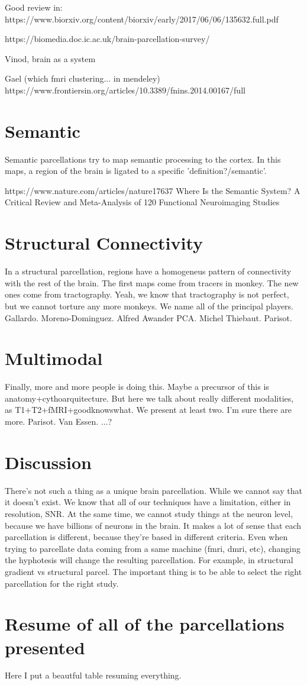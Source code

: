 Good review in:
https://www.biorxiv.org/content/biorxiv/early/2017/06/06/135632.full.pdf

https://biomedia.doc.ic.ac.uk/brain-parcellation-survey/

Vinod, brain as a system

Gael (which fmri clustering... in mendeley)
https://www.frontiersin.org/articles/10.3389/fnins.2014.00167/full

\section{Semantic}
Semantic parcellations try to map semantic processing to the cortex.
In this maps, a region of the brain is ligated to a specific 'definition?/semantic'.

https://www.nature.com/articles/nature17637
Where Is the Semantic System? A Critical Review and Meta-Analysis of 120 Functional Neuroimaging Studies

\section{Structural Connectivity}
In a structural parcellation, regions have a homogeneus pattern of connectivity
with the rest of the brain. The first maps come from tracers in monkey. The new
ones come from tractography. Yeah, we know that tractography is not perfect,
but we cannot torture any more monkeys. We name all of the principal players.
Gallardo.
Moreno-Dominguez.
Alfred Awander PCA.
Michel Thiebaut.
Parisot.

\section{Multimodal}
Finally, more and more people is doing this. Maybe a precursor of this is
anatomy+cythoarquitecture. But here we talk about really different modalities,
as T1+T2+fMRI+goodknowswhat. We present at least two. I'm sure there are more.
Parisot.
Van Essen.
...?

\section{Discussion}
There's not such a thing as a unique brain parcellation. While we cannot say
that it doesn't exist. We know that all of our techniques have a limitation,
either in resolution, SNR. At the same time, we cannot study things at the
neuron level, because we have billions of neurons in the brain. It makes a
lot of sense that each parcellation is different, because they're based
in different criteria. Even when trying to parcellate data coming from a
same machine (fmri, dmri, etc), changing the hyphotesis will change the 
resulting parcellation. For example, in structural gradient vs structural
parcel. The important thing is to be able to select the right parcellation
for the right study.

\section{Resume of all of the parcellations presented}
Here I put a beautful table resuming everything.
